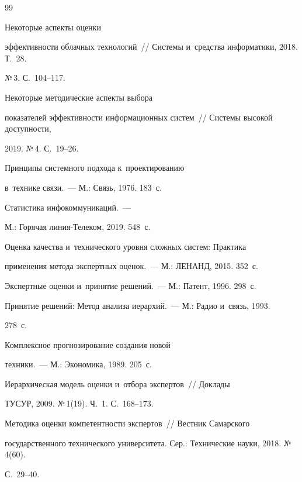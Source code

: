 {{\begin{thebibliography}{99}

 Некоторые аспекты оценки 

эффективности облачных технологий~/\!\!/ Системы и~средства информатики, 2018. Т.~28. 

№\,3. С.~104--117.


 Некоторые методические аспекты выбора 

показателей эффективности информационных систем~/\!\!/ Системы высокой доступности, 

2019. №\,4. С.~19--26.


 Принципы системного подхода к~проектированию 

в~технике связи.~--- М.: Связь, 1976. 183~с.


 Статистика инфокоммуникаций.~--- 

М.: Горячая ли\-ния-Те\-ле\-ком, 2019. 548~с. 


 Оценка качества и~технического уровня сложных систем: Практика 

применения метода экспертных оценок.~--- М.: ЛЕНАНД, 2015. 352~с.


 Экспертные оценки и~принятие решений.~--- М.: Патент, 1996. 298~с.


 Принятие решений: Метод анализа иерархий.~--- М.: Радио и~связь, 1993. 

278~с.


 Комплексное прогнозирование создания новой 

техники.~--- М.: Экономика, 1989. 205~с.


 Иерархическая модель оценки и~отбора экспертов~/\!\!/ Доклады 

ТУСУР, 2009. №\,1(19). Ч.~1. С.~168--173.


 Методика оценки компетентности экспертов~/\!\!/ Вестник Самарского 

государственного технического университета. Сер.: Технические науки, 2018. №\,4(60). 

С.~29--40. 

       \end{thebibliography}

} }







